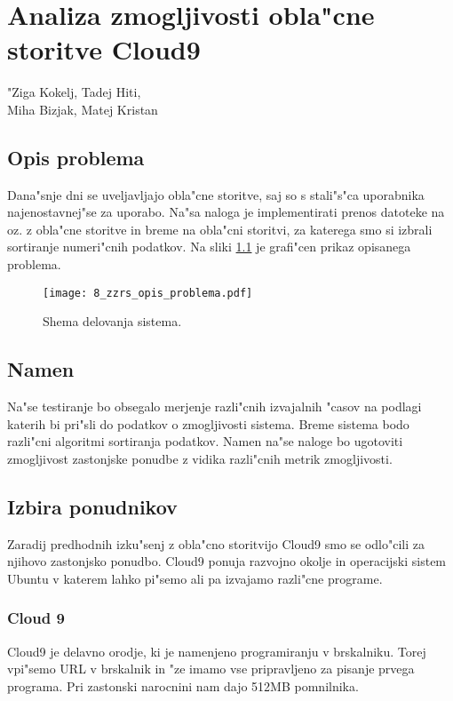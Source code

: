 \chapter[Analiza zmogljivosti obla"cne storitve c9]{Analiza zmogljivosti obla"cne storitve Cloud9}

\pagestyle{fancy}
\fancyhf{}
\fancyhead[LE,RO]{\thepage}
\fancyhead[RE,LO]{\leftmark}

\huge "Ziga Kokelj, Tadej Hiti,\\Miha Bizjak, Matej Kristan
\normalsize
\bigskip

\section{Opis problema}

\noindent Dana"snje dni se uveljavljajo obla"cne storitve, saj so s stali"s"ca uporabnika najenostavnej"se za uporabo. Na"sa naloga je implementirati prenos datoteke na oz. z obla"cne storitve in breme na obla"cni storitvi, za katerega smo si izbrali sortiranje numeri"cnih podatkov.
\noindent Na sliki \ref{8_opis_problema} je grafi"cen prikaz opisanega problema.

\begin{figure}
  \centering
    \texttt{[image: 8\_zzrs\_opis\_problema.pdf]}
  \caption{Shema delovanja sistema.}
  \label{8_opis_problema}
\end{figure}


\section{Namen}

Na"se testiranje bo obsegalo merjenje razli"cnih izvajalnih "casov na podlagi katerih bi pri"sli do podatkov o zmogljivosti sistema. Breme sistema bodo razli"cni algoritmi sortiranja podatkov. Namen na"se naloge bo ugotoviti zmogljivost zastonjske ponudbe z vidika razli"cnih metrik zmogljivosti.


\section{Izbira ponudnikov}
Zaradij predhodnih izku"senj z obla"cno storitvijo Cloud9 smo se odlo"cili za njihovo zastonjsko ponudbo. Cloud9 ponuja razvojno okolje in operacijski sistem Ubuntu v katerem lahko pi"semo ali pa izvajamo razli"cne programe.

\subsection{Cloud 9}
Cloud9 je delavno orodje, ki je namenjeno programiranju v brskalniku. Torej vpi"semo URL v brskalnik in "ze imamo vse pripravljeno za pisanje prvega programa. Pri zastonski narocnini nam dajo 512MB pomnilnika.

